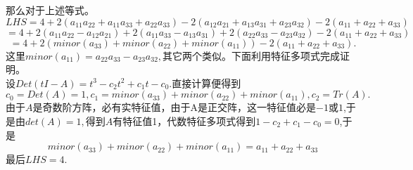 \documentclass[UTF8]{article}
\begin{document}
	那么对于上述等式。\\
	$$LHS=4+2(a_{11}a_{22}+a_{11}a_{33}+a_{22}a_{33})-2(a_{12}a_{21}+a_{13}a_{31}+a_{23}a_{32})-2(a_{11}+a_{22}+a_{33})$$
	$$=4+2(a_{11}a_{22}-a_{12}a_{21})+2(a_{11}a_{33}-a_{13}a_{31})+2(a_{22}a_{33}-a_{23}a_{32})-2(a_{11}+a_{22}+a_{33})$$
	$$=4+2(minor(a_{33})+minor(a_{22})+minor(a_{11}))-2(a_{11}+a_{22}+a_{33}).$$
	这里$minor(a_{11})=a_{22}a_{33}-a_{23}a_{32},$其它两个类似。下面利用特征多项式完成证明。\\
	设$Det(tI-A)=t^{3}-c_{2}t^{2}+c_{1}t-c_{0}.$直接计算便得到$c_{0}=Det(A)=1,c_{1}=minor(a_{33})+minor(a_{22})+minor(a_{11}),c_{2}=Tr(A).$由于$A$是奇数阶方阵，必有实特征值，由于A是正交阵，这一特征值必是$-1$或$1$,于是由$det(A)=1,$得到$A$有特征值1，代数特征多项式得到$
	1-c_{2}+c_{1}-c_{0}=0
	$,于是$$
	minor(a_{33})+minor(a_{22})+minor(a_{11})=a_{11}+a_{22}+a_{33}
	$$
	最后$LHS=4$.\\
	
\end{document}
